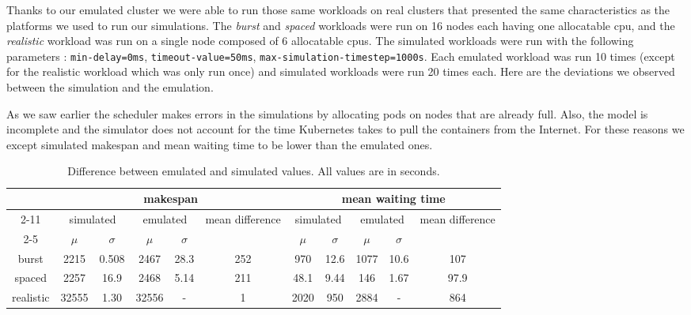 Thanks to our emulated cluster we were able to run those same workloads on real
clusters that presented the same characteristics as the platforms we used to
run our simulations. The \textit{burst} and \textit{spaced} workloads were run
on 16 nodes each having one allocatable cpu, and the \textit{realistic}
workload was run on a single node composed of 6 allocatable cpus. The simulated
workloads were run with the following parameters : \texttt{min-delay=0ms},
\texttt{timeout-value=50ms}, \texttt{max-simulation-timestep=1000s}. Each
emulated workload was run 10 times (except for the realistic workload which was
only run once) and simulated workloads were run 20 times each. Here are the
deviations we observed between the simulation and the emulation.

As we saw earlier the scheduler makes errors in the simulations by allocating
pods on nodes that are already full. Also, the model is incomplete and the
simulator does not account for the time Kubernetes takes to pull the containers
from the Internet. For these reasons we except simulated makespan and mean
waiting time to be lower than the emulated ones.

\begin{table}
	\centering
	\begin{tabular}{|c|c|c|c|c|c|c|c|c|c|c|}
		\hline

		\multirow{4}{*}{} & \multicolumn{5}{c|}{\textbf{makespan}} & \multicolumn{5}{c|}{\textbf{mean waiting time}}\\

		\cline{2-11}

		& \multicolumn{2}{c|}{simulated} &
		\multicolumn{2}{c|}{emulated}& \multirow{2}{*}{mean difference}
		& \multicolumn{2}{c|}{simulated} &
		\multicolumn{2}{c|}{emulated} & \multirow{2}{*}{mean
		difference} \\

		\cline{2-5}\cline{7-10}

		& $\mu$ & $\sigma$ & $\mu$ & $\sigma$ & & $\mu$ & $\sigma$ & $\mu$ & $\sigma$ & \\
		
		\hline

		burst & 2215 & 0.508 & 2467 & 28.3 & 252 & 970 & 12.6 & 1077 & 10.6 & 107\\
		spaced & 2257 & 16.9 & 2468 & 5.14 & 211 & 48.1 & 9.44 & 146 & 1.67 & 97.9 \\
		realistic & 32555 & 1.30 & 32556 & - & 1 & 2020 & 950 & 2884 & - & 864\\
		\hline
	\end{tabular}
	\caption{Difference between emulated and simulated values. All values are in seconds.}
	\label{tab:deviation}
\end{table}

